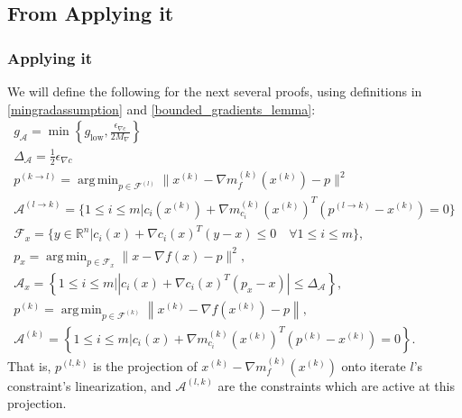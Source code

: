 \documentclass{article}
\newtheorem{lemma}[theorem]{Lemma}
\theoremstyle{case}
\numberwithin{theorem}{subsection}
\DeclareMathOperator*{\argmin}{arg\,min}
\newcommand{\feasiblek}{{\mathcal F^{(k)}}}
\newcommand{\gk}{{\nabla m_f^{(k)}\left(x^{(k)}\right)}}
\newcommand{\gmcik}{{\nabla m_{c_i}^{(k)}\left(\xk\right)}}
\newcommand{\gradf}{\nabla f}
\newcommand{\maxgrad}{{M_{\nabla}}}
\newcommand{\minactivegraddelta}{{\Delta_{\mathcal A}}}
\newcommand{\minactivegrad}{{ g_{\mathcal A} }}
\newcommand{\mingradepsilon}{{\epsilon_{\nabla c}}}
\newcommand{\mingrad}{{ g_{\textrm{low}} }}
\newcommand{\Rn}{\mathbb R^n}
\newcommand{\xk}{{x^{(k)}}}
\begin{document}
\color{black}


% 




\subsection{From Applying it}


\subsubsection{Applying it}
\color{red}
We will define the following for the next several proofs, using definitions in \cref{mingradassumption} and \cref{bounded_gradients_lemma}:
\begin{align}
\minactivegrad = \min\left\{\mingrad, \frac {\mingradepsilon} {2 \maxgrad}  \right\} \label{define_minactivegrad_orig} \\
\minactivegraddelta = \frac 1 2 \mingradepsilon \label{define_minactivedelta_orig} \\
p^{(k \to l)} = \argmin_{p \in \mathcal F^{(l)}} \|\xk - \gk - p\|^2 \label{bp_define_plk_orig} \\
\mathcal A^{(l \to k)} = \{1 \le i \le m | c_i(\xk) + \gmcik^T(p^{(l\to k)} - \xk) = 0 \} \label{bp_define_activep} \\
\mathcal F_x = \{ y \in \Rn | c_i(x) + \nabla c_i(x)^T(y - x) \le 0 \quad \forall 1 \le i \le m\}, \label{bp_define_true_linearization} \\
p_x = \argmin_{p \in \mathcal F_x} \|x - \gradf(x) - p\|^2, \label{bp_define_true_projection} \\
\mathcal A_x = \left\{1 \le i \le m | \left|c_i(x) + \nabla c_i(x)^T(p_x - x)\right| \le \minactivegraddelta \right\}, \label{define_projection_active} \\
p^{(k)} = \argmin_{p \in \feasiblek} \left\| \xk - \nabla f\left(\xk\right) - p \right\|, \label{bp_define_pl} \\
\mathcal A^{(k)} = \left\{1 \le i \le m | c_i(x) + \gmcik^T\left(p^{(k)} - \xk\right) = 0 \right\}. \label{bp_define_yet_another_thing}
\end{align}
That is, $p^{(l, k)}$ is the projection of $\xk - \gk$ onto iterate $l$'s constraint's linearization,
and $\mathcal A^{(l, k)}$ are the constraints which are active at this projection.
\end{document}
